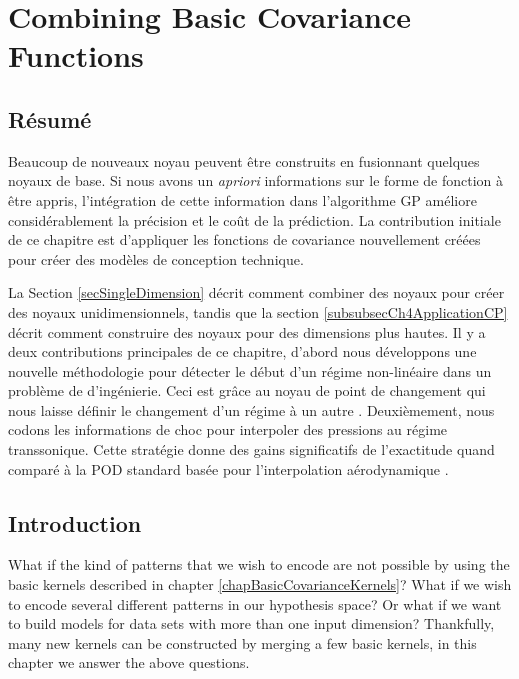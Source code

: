 \chapter{Combining Basic Covariance Functions}
\label{chapCombiningBasicCovariances}

\begin{mdframed}[hidealllines=true,backgroundcolor=lightgray!20]
\section*{Résumé}
Beaucoup de nouveaux noyau peuvent être construits en fusionnant quelques noyaux de base. Si nous avons un \textit{apriori} informations sur le forme de fonction à être appris, l'intégration de cette information dans l'algorithme GP améliore considérablement la précision et le coût de la prédiction. La contribution initiale de ce chapitre est d'appliquer les fonctions de covariance nouvellement créées pour créer des modèles de conception technique.

La Section \ref{secSingleDimension} décrit comment combiner des noyaux pour créer des noyaux unidimensionnels, tandis que la section \ref{subsubsecCh4ApplicationCP} décrit comment construire des noyaux pour des dimensions plus hautes. Il y a deux contributions principales de ce chapitre, d'abord nous développons une nouvelle méthodologie pour détecter le début d'un régime non-linéaire dans un problème de d'ingénierie. Ceci est grâce au noyau de point de changement qui nous laisse définir le changement d'un régime à un autre \cite{chiplunkar:hal-01555401}. Deuxièmement, nous codons les informations de choc pour interpoler des pressions au régime transsonique. Cette stratégie donne des gains significatifs de l'exactitude quand comparé à la POD standard basée pour l'interpolation aérodynamique \cite{oatao18004}.
\end{mdframed}



\section{Introduction}

What if the kind of patterns that we wish to encode are not possible by using the basic kernels described in chapter \ref{chapBasicCovarianceKernels}? What if we wish to encode several different patterns in our hypothesis space? Or what if we want to build models for data sets with more than one input dimension? Thankfully, many new kernels can be constructed by merging a few basic kernels, in this chapter we answer the above questions. 

